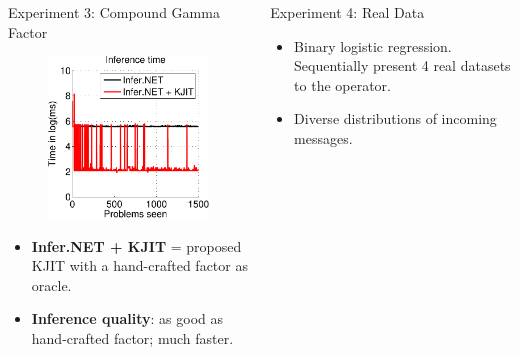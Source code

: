 \documentclass[english]{beamer}
\begin{document}
\begin{frame}
\begin{columns}[t]
\begin{block}{ Experiment 3: Compound Gamma Factor }
\begin{figure}[ht]
{  \includegraphics[width=11.2cm]{online/cg_inference_time-crop}
  }
  \label{fig:cg_performance}
\end{figure}

\vspace{5mm}

\begin{itemize}
    \item \textbf{Infer.NET + KJIT} = proposed KJIT with a hand-crafted factor as oracle.
    \item \textbf{Inference quality}: as good as hand-crafted factor; much faster.
\end{itemize}
\end{block}

\begin{block}{ Experiment 4: Real Data}
\begin{itemize}
    \item Binary logistic regression.  Sequentially present 4 real datasets
        to the operator.
    \item Diverse distributions of incoming messages.
\end{itemize}


\end{block}
\end{columns}
\end{frame}
\end{document}
